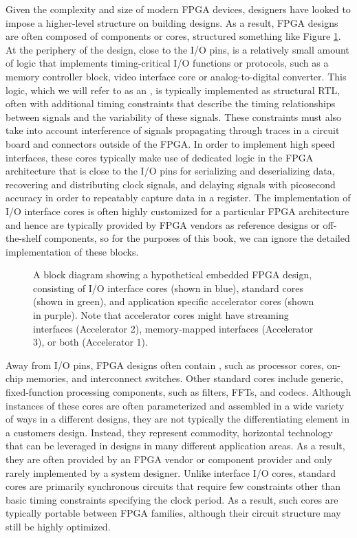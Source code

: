 Given the complexity and size of modern FPGA devices, designers have looked to impose a higher-level structure on building designs.  As a result, FPGA designs are often composed of components or \glspl{core}, structured something like Figure \ref{fig:designTemplate}.  At the periphery of the design, close to the I/O pins, is a relatively small amount of logic that implements timing-critical I/O functions or protocols, such as a memory controller block, video interface core or analog-to-digital converter.  This logic, which we will refer to as an , is typically implemented as structural RTL, often with additional timing constraints that describe the timing relationships between signals and the variability of these signals.   These constraints must also take into account interference of signals propagating through traces in a circuit board and connectors outside of the FPGA.  In order to implement high speed interfaces, these cores typically make use of dedicated logic in the FPGA architecture that is close to the I/O pins for serializing and deserializing data, recovering and distributing clock signals, and delaying signals with picosecond accuracy in order to repeatably capture data in a register.  The implementation of I/O interface cores is often highly customized for a particular FPGA architecture and hence are typically provided by FPGA vendors as reference designs or off-the-shelf components, so for the purposes of this book, we can ignore the detailed implementation of these blocks.

\begin{figure}
\centering
\begin{tiny}
\def\svgwidth{\columnwidth}

\end{tiny}
\caption{A block diagram showing a hypothetical embedded FPGA design, consisting of I/O interface cores (shown in blue), standard cores (shown in green), and application specific accelerator cores (shown in purple).  Note that accelerator cores might have streaming interfaces (Accelerator 2), memory-mapped interfaces (Accelerator 3), or both (Accelerator 1). }
\label{fig:designTemplate}
\end{figure}

Away from I/O pins, FPGA designs often contain , such as processor cores, on-chip memories, and interconnect switches.   Other standard cores include generic, fixed-function processing components, such as filters, FFTs, and codecs.  Although instances of these cores are often parameterized and assembled in a wide variety of ways in a different designs, they are not typically the differentiating element in a customers design.  Instead, they represent commodity, horizontal technology that can be leveraged in designs in many different application areas.   As a result, they are often provided by an FPGA vendor or component provider and only rarely implemented by a system designer.  Unlike interface I/O cores, standard cores are primarily synchronous circuits that require few constraints other than basic timing constraints specifying the clock period.  As a result, such cores are typically portable between FPGA families, although their circuit structure may still be highly optimized.

